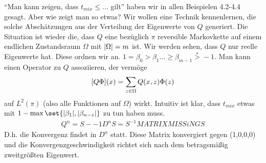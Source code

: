  \enquote{Man kann zeigen, dass $t_{mix} \leq \dots$ gilt} haben wir in allen Beispielen 4.2-4.4  gesagt. Aber wie zeigt man so etwas? Wir wollen eine Technik kennenlernen, die solche Abschätzungen aus der Verteilung der Eigenwerte von $Q$ generiert. Die Situation ist wieder die, dass $Q$ eine bezüglich $\pi$ reversible Markovkette auf einem endlichen Zustandsraum $\Omega$ mit $\lvert\Omega\rvert = m$ ist. Wir werden sehen, dass $Q$ nur reelle Eigenwerte hat. Diese ordnen wir an. $1 = \beta_0 > \beta_1 \dots \geq \beta_{m-1} \overset{*}{>} -1$. Man kann einen Operator zu $Q$ assoziieren, der vermöge
 \begin{align}
 	\benb{Q\Phi}(x) = \sum\limits_{z \in \Omega} Q(x,z)\Phi(z)
 \end{align}
 auf $L^2(\pi)$ (also alle Funktionen auf $\Omega$) wirkt. Intuitiv ist klar, dass $t_{mix}$ etwas mit $1 - \max\set{\abs{\beta_1},\abs{\beta_{n-z}}}$ zu tun haben muss. 
 	\begin{align}
 		Q^n = S-{-1} D^n S = S^{-1} MATRIXMISSiNG S
  	\end{align}
  	D.h. die Konvergenz findet in $D^n$ statt. Diese Matrix konvergiert gegen  (1,0,0,0) und die Konvergenzgeschwindigkeit richtet sich nach dem betragsmäßig zweitgrößten Eigenwert.
  	
